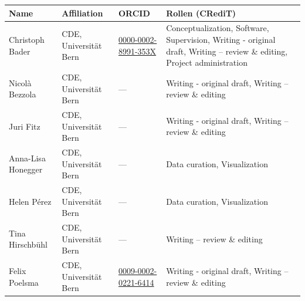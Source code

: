 \documentclass[
  nswissgerman,
  a4paper,
  openany]{book}
\newcounter{none} %
\begin{document}
\begin{tcolorbox}[enhanced jigsaw, arc=.35mm, bottomrule=.15mm, bottomtitle=1mm, breakable, colback=white, colbacktitle=quarto-callout-note-color!10!white, colframe=quarto-callout-note-color-frame, coltitle=black, left=2mm, leftrule=.75mm, opacityback=0, opacitybacktitle=0.6, rightrule=.15mm, title={Beitragsmatrix (CRediT-Taxonomie)}, titlerule=0mm, toprule=.15mm, toptitle=1mm]

{\def\LTcaptype{none} %
\begin{longtable}[]{@{}
  >{\raggedright\arraybackslash}p{}
  >{\raggedright\arraybackslash}p{}
  >{\raggedright\arraybackslash}p{}
  >{\raggedright\arraybackslash}p{}@{}}
\toprule\noalign{}
\begin{minipage}[b]{\linewidth}\raggedright
Name
\end{minipage} & \begin{minipage}[b]{\linewidth}\raggedright
Affiliation
\end{minipage} & \begin{minipage}[b]{\linewidth}\raggedright
ORCID
\end{minipage} & \begin{minipage}[b]{\linewidth}\raggedright
Rollen (CRediT)
\end{minipage} \\
\midrule\noalign{}
\endhead
\bottomrule\noalign{}
\endlastfoot
Christoph Bader & CDE, Universität Bern &
\href{https://orcid.org/0000-0002-8991-353X}{0000-0002-8991-353X} &
Conceptualization, Software, Supervision, Writing - original draft,
Writing -- review \& editing, Project administration \\
Nicolà Bezzola & CDE, Universität Bern & --- & Writing - original draft,
Writing -- review \& editing \\
Juri Fitz & CDE, Universität Bern & --- & Writing - original draft,
Writing -- review \& editing \\
Anna-Lisa Honegger & CDE, Universität Bern & --- & Data curation,
Visualization \\
Helen Pérez & CDE, Universität Bern & --- & Data curation,
Visualization \\
Tina Hirschbühl & CDE, Universität Bern & --- & Writing -- review \&
editing \\
Felix Poelsma & CDE, Universität Bern &
\href{https://orcid.org/0009-0002-0221-6414}{0009-0002-0221-6414} &
Writing - original draft, Writing -- review \& editing \\
\end{longtable}
}

\end{tcolorbox}
\end{document}
